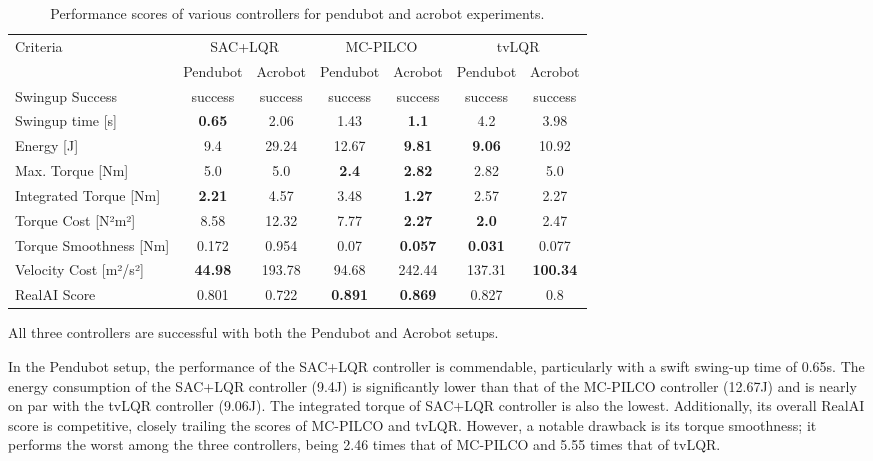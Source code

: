 \begin{table}[H]
  \centering
 \begin{tabular}{lcccccc}
 \hline
 Criteria & \multicolumn{2}{c}{SAC+LQR} & \multicolumn{2}{c}{MC-PILCO} & \multicolumn{2}{c}{tvLQR} \\
 & Pendubot & Acrobot & Pendubot & Acrobot & Pendubot & Acrobot \\
 \hline
 Swingup Success & success & success & success & success & success & success \\
 Swingup time [s] & \textbf{0.65} & 2.06 & 1.43 & \textbf{1.1} & 4.2 & 3.98 \\
 Energy [J] & 9.4 & 29.24 & 12.67 & \textbf{9.81} & \textbf{9.06} & 10.92 \\
 Max. Torque [Nm] & 5.0 & 5.0 & \textbf{2.4} & \textbf{2.82} & 2.82 & 5.0 \\
 Integrated Torque [Nm] & \textbf{2.21} & 4.57 & 3.48 & \textbf{1.27} & 2.57 & 2.27 \\
 Torque Cost [N²m²] & 8.58 & 12.32 & 7.77 & \textbf{2.27} & \textbf{2.0} & 2.47 \\
 Torque Smoothness [Nm] & 0.172 & 0.954 & 0.07 & \textbf{0.057} & \textbf{0.031} & 0.077 \\
 Velocity Cost [m²/s²] & \textbf{44.98} & 193.78 & 94.68 & 242.44 & 137.31 & \textbf{100.34} \\
 RealAI Score & 0.801 & 0.722 & \textbf{0.891} & \textbf{0.869} & 0.827 & 0.8 \\
 \hline
 \end{tabular}
 \caption{Performance scores of various controllers for pendubot and acrobot experiments.}
 \label{tab:performance_ideal}
\end{table}

All three controllers are successful with both the Pendubot and Acrobot setups.

In the Pendubot setup, the performance of the SAC+LQR controller is commendable, particularly with a swift swing-up time of 0.65s. The energy consumption of the SAC+LQR controller (9.4J) is significantly lower than that of the MC-PILCO controller (12.67J) and is nearly on par with the tvLQR controller (9.06J). The integrated torque of SAC+LQR controller is also the lowest. Additionally, its overall RealAI score is competitive, closely trailing the scores of MC-PILCO and tvLQR. However, a notable drawback is its torque smoothness; it performs the worst among the three controllers, being 2.46 times that of MC-PILCO and 5.55 times that of tvLQR.

